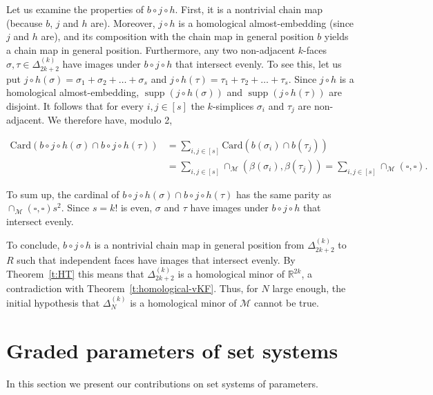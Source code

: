 \documentclass[a4paper,UKenglish,thm-restate]{article}
\newcommand{\R}{\mathbb{R}}
\newcommand{\M}{\mathcal{M}}
\DeclareMathOperator{\supp}{supp}
\newcommand{\card}[1]{\textrm{Card}\pth{#1}}
\newcommand{\pth}[1]{\left(#1\right)}
\begin{document}
\medskip
 
Let us examine the properties of $b\circ j \circ h$. First, it is a nontrivial chain map (because $b$, $j$ and $h$ are). Moreover, $j \circ h$ is a homological almost-embedding (since $j$ and $h$ are), and its composition with the chain map in general position $b$ yields a chain map in general position. Furthermore, any two non-adjacent $k$-faces $\sigma,\tau \in \Delta_{2k+2}^{(k)}$ have images under $b\circ j \circ h$ that intersect evenly. To see this, let us put $j \circ h(\sigma) = \sigma_1+\sigma_2+\ldots +\sigma_s$ and $j \circ h(\tau) = \tau_1+\tau_2+\ldots+\tau_s$. Since $j \circ h$ is a homological almost-embedding, $\supp(j \circ h(\sigma))$ and $\supp(j \circ h(\tau))$ are disjoint. It follows that for every $i,j \in [s]$ the $k$-simplices $\sigma_i$ and $\tau_j$ are non-adjacent. We therefore have, modulo 2, 

\[\begin{aligned}
\card{b\circ j \circ h(\sigma) \cap b\circ j \circ h(\tau)} &= \sum_{i,j \in [s]} \card{b(\sigma_i) \cap b(\tau_j)}\\
&= \sum_{i,j \in [s]} \cap_{\M}(\beta(\sigma_i),\beta(\tau_j)) = \sum_{i,j \in [s]} \cap_{\M}(\square,\square).
\end{aligned}  \]

\noindent
To sum up, the cardinal of $b\circ j \circ h(\sigma) \cap b\circ j \circ h(\tau)$ has the same parity as $\cap_{\M}(\square,\square)s^2$. Since $s=k!$ is even, $\sigma$ and $\tau$ have images under $b\circ j \circ h$ that intersect evenly.

\medskip

To conclude, $b\circ j \circ h$ is a nontrivial chain map in general position from $\Delta_{2k+2}^{(k)}$ to $R$ such that independent faces have images that intersect evenly. By Theorem~\ref{t:HT} this means that $\Delta_{2k+2}^{(k)}$ is a homological minor of $\R^{2k}$, a contradiction with Theorem~\ref{t:homological-vKF}. Thus, for $N$ large enough, the initial hypothesis that $\Delta_N^{(k)}$ is a homological minor of $\M$ cannot be true.


  
\section{Graded parameters of set systems}\label{s:graded}

In this section we present our contributions on set systems of parameters. %
\end{document}
